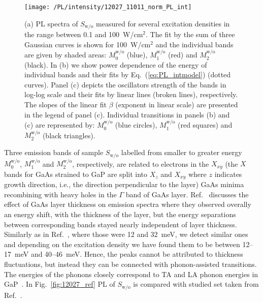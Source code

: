 \begin{figure}
	\centering
	\texttt{[image: /PL/intensity/12027\_11011\_norm\_PL\_int]}
	\caption{(a) PL spectra of $S_\mathrm{w/o}$ measured for several excitation densities in the range between 0.1 and 100~W/cm$^2$. The fit by the sum of three Gaussian curves is shown for 100~W/cm$^2$ and the individual bands are given by shaded areas: $M_0^\mathrm{w/o}$ (blue), $M_1^\mathrm{w/o}$ (red) and $M_2^\mathrm{w/o}$ (black). In (b) we show power dependence of the energy of individual bands and their fits by Eq.~(\ref{eq:PL_intmodel}) (dotted curves). Panel (c) depicts the oscillators strength of the bands in log-log scale and their fits by linear lines (broken lines), respectively. The slopes of the linear fit $\beta$ (exponent in linear scale) are presented in the legend of panel (c). Individual transitions in panels (b) and (c) are represented by: $M_0^\mathrm{w/o}$ (blue circles), $M_1^\mathrm{w/o}$ (red squares) and $M_2^\mathrm{w/o}$ (black triangles).}
	\label{fig:QD_wo_int}
\end{figure}
%
Three emission bands of sample $S_\mathrm{w/o}$ labelled from smaller to greater energy $M_0^\mathrm{w/o}$, $M_1^\mathrm{w/o}$ and $M_2^\mathrm{w/o}$, respectively, are related to electrons in the $X_{xy}$ (the $X$ bands for GaAs strained to GaP are split into $X_z$ and $X_{xy}$ where $z$ indicates growth direction, i.e., the direction perpendicular to the layer) GaAs minima recombining with heavy holes in the $\Gamma$ band of GaAs layer. Ref.~\citep{Prieto_APL1997} discusses the effect of GaAs layer thickness on emission spectra where they observed overally an energy shift, with the thickness of the layer, but the energy separations between corresponding bands stayed nearly independent of layer thickness. Similarly as in Ref.~\citep{Prieto_APL1997}, where those were 12 and 32~meV, we detect similar ones and depending on the excitation density we have found them to be between 12--17~meV and 40--46~meV. Hence, the peaks cannot be attributed to thickness fluctuations, but instead they can be connected with phonon-assisted transitions. The energies of the phonons closely correspond to TA and LA phonon energies in GaP~\citep{Prieto_APL1997}. In Fig.~\ref{fig:12027_ref} PL of $S_\mathrm{w/o}$ is compared with studied set taken from Ref.~\citep{Prieto_APL1997}.



